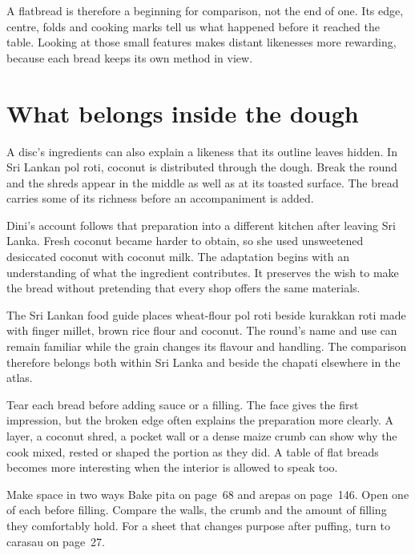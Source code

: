 A flatbread is therefore a beginning for comparison, not the end of one. Its edge, centre, folds and cooking marks tell us what happened before it reached the table. Looking at those small features makes distant likenesses more rewarding, because each bread keeps its own method in view.

\section{What belongs inside the dough}
A disc's ingredients can also explain a likeness that its outline leaves hidden. In Sri Lankan pol roti, coconut is distributed through the dough. Break the round and the shreds appear in the middle as well as at its toasted surface. The bread carries some of its richness before an accompaniment is added.\citep{roshanipol06}

Dini's account follows that preparation into a different kitchen after leaving Sri Lanka. Fresh coconut became harder to obtain, so she used unsweetened desiccated coconut with coconut milk. The adaptation begins with an understanding of what the ingredient contributes. It preserves the wish to make the bread without pretending that every shop offers the same materials.\citep{dinipol06}

The Sri Lankan food guide places wheat-flour pol roti beside kurakkan roti made with finger millet, brown rice flour and coconut. The round's name and use can remain familiar while the grain changes its flavour and handling. The comparison therefore belongs both within Sri Lanka and beside the chapati elsewhere in the atlas.\citep{srilankafoods06}

Tear each bread before adding sauce or a filling. The face gives the first impression, but the broken edge often explains the preparation more clearly. A layer, a coconut shred, a pocket wall or a dense maize crumb can show why the cook mixed, rested or shaped the portion as they did. A table of flat breads becomes more interesting when the interior is allowed to speak too.

\begin{breadnote}{Make space in two ways}
Bake pita on page~68 and arepas on page~146. Open one of each before filling. Compare the walls, the crumb and the amount of filling they comfortably hold. For a sheet that changes purpose after puffing, turn to carasau on page~27.
\end{breadnote}
